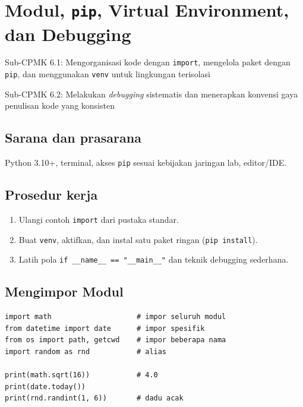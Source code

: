 \documentclass[../main.tex]{subfiles}
\begin{document}
\chapter{Modul, \texttt{pip}, Virtual Environment, dan Debugging}

\begin{subcpmk}
  \item Sub-CPMK 6.1: Mengorganisasi kode dengan \texttt{import}, mengelola paket dengan \texttt{pip}, dan menggunakan \texttt{venv} untuk lingkungan terisolasi
  \item Sub-CPMK 6.2: Melakukan \textit{debugging} sistematis dan menerapkan konvensi gaya penulisan kode yang konsisten
\end{subcpmk}


\section{Sarana dan prasarana}

Python 3.10+, terminal, akses \texttt{pip} sesuai kebijakan jaringan lab, editor/IDE.

\section{Prosedur kerja}

\begin{enumerate}[leftmargin=*]
  \item Ulangi contoh \texttt{import} dari pustaka standar.
  \item Buat \texttt{venv}, aktifkan, dan instal satu paket ringan (\texttt{pip install}).
  \item Latih pola \texttt{if \_\_name\_\_ == "\_\_main\_\_"} dan teknik debugging sederhana.
\end{enumerate}

\section{Mengimpor Modul}

\begin{lstlisting}[caption=Pola import (Tutorial Python ss6)]
import math                    # impor seluruh modul
from datetime import date      # impor spesifik
from os import path, getcwd    # impor beberapa nama
import random as rnd           # alias

print(math.sqrt(16))           # 4.0
print(date.today())
print(rnd.randint(1, 6))       # dadu acak
\end{lstlisting}
\end{document}
